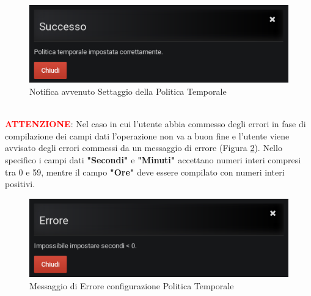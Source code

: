 \begin{figure}[H]
	\begin{center}
		\includegraphics[scale=0.6]{./images/NotificaPolicy.png}
		 \caption{Notifica avvenuto Settaggio della Politica Temporale}	
		 \label{NotificaPolicy}
	\end{center}
\end{figure}

~\\
\textbf{\textcolor{red}{ATTENZIONE}}: Nel caso in cui l'utente abbia commesso degli errori in fase di compilazione dei campi dati l'operazione non va a buon fine e l'utente viene avvisato degli errori commessi da un messaggio di errore (Figura \ref{ErrorePolicy}). Nello specifico i campi dati \textbf{"Secondi"} e \textbf{"Minuti"} accettano numeri interi compresi tra 0 e 59, mentre il campo \textbf{"Ore"} deve essere compilato con numeri interi positivi.

\begin{figure}[H]
	\begin{center}
		\includegraphics[scale=0.6]{./images/ErrorePolicy.png}
		 \caption{Messaggio di Errore configurazione Politica Temporale}	
		 \label{ErrorePolicy}
	\end{center}
\end{figure}

